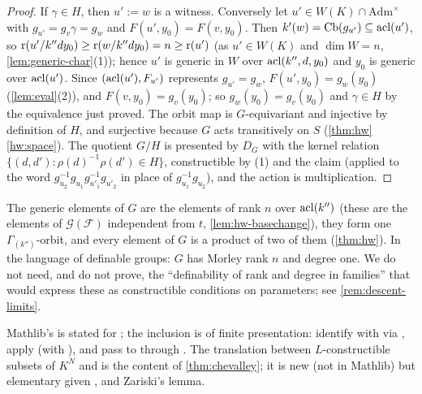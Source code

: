 \begin{proof}
If $\gamma\in H$, then $u':=w$ is a witness.  Conversely let $u'\in W(K)\cap\mathrm{Adm}^\times$
with $g_{u'}=g_v\gamma=g_w$ and $F(u',y_0)=F(v,y_0)$.  Then $k'(w)=\operatorname{Cb}(g_{u'})\subseteq\operatorname{acl}(u')$,
so $\operatorname{r}(u'/k''dy_0)\ge\operatorname{r}(w/k''dy_0)=n\ge\operatorname{r}(u')$ (as $u'\in W(K)$ and $\dim W=n$,
\cref{lem:generic-char}(1)); hence $u'$ is generic in $W$ over $\operatorname{acl}(k'',d,y_0)$ and $y_0$ is
generic over $\operatorname{acl}(u')$.  Since $(\operatorname{acl}(u'),F_{u'})$ represents $g_{u'}=g_w$,
$F(u',y_0)=g_w(y_0)$ (\cref{lem:eval}(2)), and $F(v,y_0)=g_v(y_0)$; so $g_w(y_0)=g_v(y_0)$ and
$\gamma\in H$ by the equivalence just proved.  The orbit map is $G$-equivariant and injective by
definition of $H$, and surjective because $G$ acts transitively on $S$
(\cref{thm:hw}\ref{hw:space}).  The quotient $G/H$ is presented by $D_G$ with the kernel
relation $\{(d,d'):\rho(d)^{-1}\rho(d')\in H\}$, constructible by (1) and the claim (applied
to the word $g_{u_2}^{-1}g_{u_1}g_{u'_1}^{-1}g_{u'_2}$ in place of $g_{u_1}^{-1}g_{u_2}$), and the
action is multiplication.
\end{proof}

\begin{remark}
\label{rem:constr-connected}
The generic elements of $G$ are the elements of rank $n$ over $\operatorname{acl}(k'')$ (these are
the elements of $\mathcal G(\mathcal F)$ independent from $t$, \cref{lem:hw-basechange}), they
form one $\Gamma_{(k'')}$-orbit, and every element of $G$ is a product of two of them
(\cref{thm:hw}).  In the language of definable groups: $G$ has Morley rank $n$ and degree
one.  We do not need, and do not prove, the ``definability of rank and degree in
families'' that would express these as constructible conditions on parameters; see
\cref{rem:descent-limits}.
\end{remark}

\begin{leannote}
Mathlib's  is stated for
; the inclusion 
is of finite presentation: identify  with
 via ,
apply  (with
), and pass to 
through .  The
translation between $L$-constructible subsets of $K^N$ and
 is the content of
\cref{thm:chevalley}; it is new (not in Mathlib) but elementary given
,  and Zariski's lemma.
\end{leannote}
